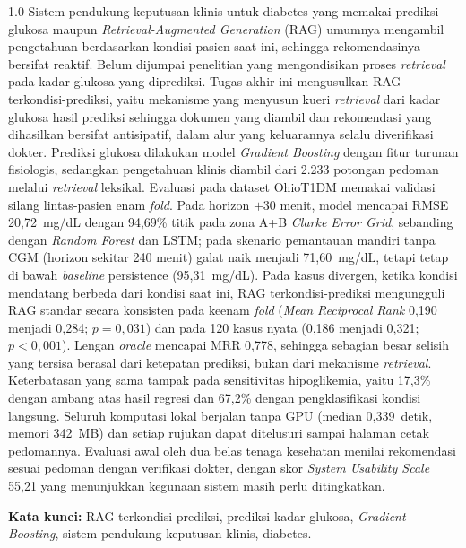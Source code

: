 \begin{spacing}{1.0}
Sistem pendukung keputusan klinis untuk diabetes yang memakai prediksi glukosa maupun
\emph{Retrieval-Augmented Generation} (RAG) umumnya mengambil pengetahuan berdasarkan kondisi
pasien saat ini, sehingga rekomendasinya bersifat reaktif. Belum dijumpai penelitian yang
mengondisikan proses \emph{retrieval} pada kadar glukosa yang diprediksi. Tugas akhir ini
mengusulkan RAG terkondisi-prediksi, yaitu mekanisme yang menyusun kueri \emph{retrieval} dari
kadar glukosa hasil prediksi sehingga dokumen yang diambil dan rekomendasi yang dihasilkan bersifat
antisipatif, dalam alur yang keluarannya selalu diverifikasi dokter. Prediksi glukosa dilakukan
model \emph{Gradient Boosting} dengan fitur turunan fisiologis, sedangkan pengetahuan klinis
diambil dari 2.233 potongan pedoman melalui \emph{retrieval} leksikal. Evaluasi pada dataset
OhioT1DM memakai validasi silang lintas-pasien enam \emph{fold}. Pada horizon $+30$ menit, model
mencapai RMSE 20,72~mg/dL dengan 94,69\% titik pada zona A+B \emph{Clarke Error Grid}, sebanding
dengan \emph{Random Forest} dan LSTM; pada skenario pemantauan mandiri tanpa CGM (horizon sekitar
240 menit) galat naik menjadi 71,60~mg/dL, tetapi tetap di bawah \emph{baseline} persistence
(95,31~mg/dL). Pada kasus divergen, ketika kondisi mendatang berbeda dari kondisi saat ini, RAG
terkondisi-prediksi mengungguli RAG standar secara konsisten pada keenam \emph{fold} (\emph{Mean
Reciprocal Rank} 0,190 menjadi 0,284; $p=0{,}031$) dan pada 120 kasus nyata (0,186 menjadi 0,321;
$p<0{,}001$). Lengan \emph{oracle} mencapai MRR 0,778, sehingga sebagian besar selisih yang tersisa
berasal dari ketepatan prediksi, bukan dari mekanisme \emph{retrieval}. Keterbatasan yang sama
tampak pada sensitivitas hipoglikemia, yaitu 17,3\% dengan ambang atas hasil regresi dan 67,2\%
dengan pengklasifikasi kondisi langsung. Seluruh komputasi lokal berjalan tanpa GPU (median
0,339~detik, memori 342~MB) dan setiap rujukan dapat ditelusuri sampai halaman cetak pedomannya.
Evaluasi awal oleh dua belas tenaga kesehatan menilai rekomendasi sesuai pedoman dengan verifikasi
dokter, dengan skor \emph{System Usability Scale} 55,21 yang menunjukkan kegunaan sistem masih
perlu ditingkatkan.

\textbf{Kata kunci:} RAG terkondisi-prediksi, prediksi kadar glukosa, \emph{Gradient Boosting}, sistem pendukung keputusan klinis, diabetes.
\end{spacing}
